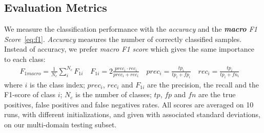\documentclass{bmvc2k}
\begin{document}
\subsection{Evaluation Metrics}
We measure the classification performance with the \textit{accuracy} and the \textit{\textbf{macro} F1 Score}~\eqref{eq:f1}. \textit{Accuracy} measures the number of correctly classified samples. Instead of accuracy, we prefer \textit{macro F1 score} which gives the same importance to each class:
\begin{equation}\begin{aligned}
F_{1macro}=\frac{1}{N_c}\sum_{i}^{N_c}F_{1i} \quad
F_{1i}=2\frac{prec_i \cdot rec_i}{prec_i+rec_i} \quad
prec_i=\frac{tp_i}{tp_i+fp_i} \quad
rec_i=\frac{tp_i}{tp_i+fn_i} \quad
\label{eq:f1}
\end{aligned}
\end{equation}
where $i$ is the class index; $prec_i$, $rec_i$  and $F_{1i}$ are the precision, the recall and the F1-score of class $i$; $N_c$ is the number of classes; $tp$, $fp$ and $fn$ are the true positives, false positives and false negatives rates. All scores are averaged on 10 runs, with different initializations, and given with associated standard deviations, on our multi-domain testing subset.
\end{document}
